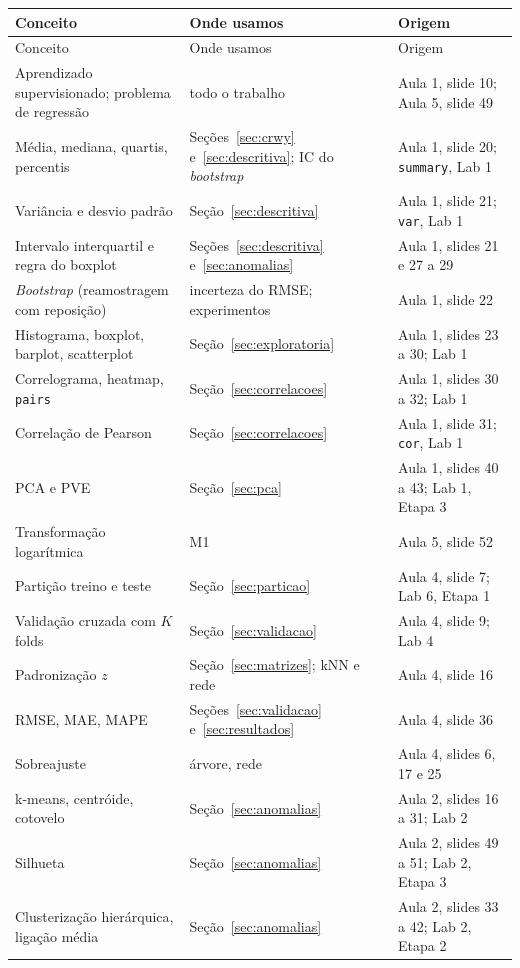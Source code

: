 \documentclass[12pt,a4paper]{article}
\begin{document}
{\scriptsize
\begin{longtable}{p{4.6cm}p{4.6cm}p{5.0cm}}
\toprule
Conceito & Onde usamos & Origem\\
\midrule
\endfirsthead
\toprule
Conceito & Onde usamos & Origem\\
\midrule
\endhead
\bottomrule
\endfoot
Aprendizado supervisionado; problema de regressão & todo o trabalho & Aula 1, slide 10; Aula 5, slide 49\\
Média, mediana, quartis, percentis & Seções~\ref{sec:crwy} e~\ref{sec:descritiva}; IC do \textit{bootstrap} & Aula 1, slide 20; \texttt{summary}, Lab 1\\
Variância e desvio padrão & Seção~\ref{sec:descritiva} & Aula 1, slide 21; \texttt{var}, Lab 1\\
Intervalo interquartil e regra do boxplot & Seções~\ref{sec:descritiva} e~\ref{sec:anomalias} & Aula 1, slides 21 e 27 a 29\\
\textit{Bootstrap} (reamostragem com reposição) & incerteza do RMSE; experimentos & Aula 1, slide 22\\
Histograma, boxplot, barplot, scatterplot & Seção~\ref{sec:exploratoria} & Aula 1, slides 23 a 30; Lab 1\\
Correlograma, heatmap, \texttt{pairs} & Seção~\ref{sec:correlacoes} & Aula 1, slides 30 a 32; Lab 1\\
Correlação de Pearson & Seção~\ref{sec:correlacoes} & Aula 1, slide 31; \texttt{cor}, Lab 1\\
PCA e PVE & Seção~\ref{sec:pca} & Aula 1, slides 40 a 43; Lab 1, Etapa 3\\
Transformação logarítmica & M1 & Aula 5, slide 52\\
Partição treino e teste & Seção~\ref{sec:particao} & Aula 4, slide 7; Lab 6, Etapa 1\\
Validação cruzada com $K$ folds & Seção~\ref{sec:validacao} & Aula 4, slide 9; Lab 4\\
Padronização $z$ & Seção~\ref{sec:matrizes}; kNN e rede & Aula 4, slide 16\\
RMSE, MAE, MAPE & Seções~\ref{sec:validacao} e~\ref{sec:resultados} & Aula 4, slide 36\\
Sobreajuste & árvore, rede & Aula 4, slides 6, 17 e 25\\
k-means, centróide, cotovelo & Seção~\ref{sec:anomalias} & Aula 2, slides 16 a 31; Lab 2\\
Silhueta & Seção~\ref{sec:anomalias} & Aula 2, slides 49 a 51; Lab 2, Etapa 3\\
Clusterização hierárquica, ligação média & Seção~\ref{sec:anomalias} & Aula 2, slides 33 a 42; Lab 2, Etapa 2\\

\end{longtable}}
\end{document}
